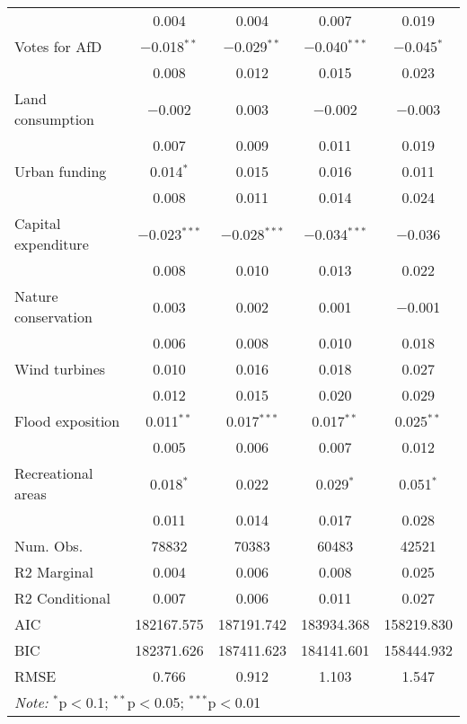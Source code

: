 \begin{table}
\begin{tabular}[t]{lcccc}
 & \num{0.004} & \num{0.004} & \num{0.007} & \num{0.019}\\
Votes for AfD & \num{-0.018}$^{**}$ & \num{-0.029}$^{**}$ & \num{-0.040}$^{***}$ & \num{-0.045}$^{*}$\\
 & \num{0.008} & \num{0.012} & \num{0.015} & \num{0.023}\\
Land consumption & \num{-0.002} & \num{0.003} & \num{-0.002} & \num{-0.003}\\
 & \num{0.007} & \num{0.009} & \num{0.011} & \num{0.019}\\
Urban funding & \num{0.014}$^{*}$ & \num{0.015} & \num{0.016} & \num{0.011}\\
 & \num{0.008} & \num{0.011} & \num{0.014} & \num{0.024}\\
Capital expenditure & \num{-0.023}$^{***}$ & \num{-0.028}$^{***}$ & \num{-0.034}$^{***}$ & \num{-0.036}\\
 & \num{0.008} & \num{0.010} & \num{0.013} & \num{0.022}\\
Nature conservation & \num{0.003} & \num{0.002} & \num{0.001} & \num{-0.001}\\
 & \num{0.006} & \num{0.008} & \num{0.010} & \num{0.018}\\
Wind turbines & \num{0.010} & \num{0.016} & \num{0.018} & \num{0.027}\\
 & \num{0.012} & \num{0.015} & \num{0.020} & \num{0.029}\\
Flood exposition & \num{0.011}$^{**}$ & \num{0.017}$^{***}$ & \num{0.017}$^{**}$ & \num{0.025}$^{**}$\\
 & \num{0.005} & \num{0.006} & \num{0.007} & \num{0.012}\\
Recreational areas & \num{0.018}$^{*}$ & \num{0.022} & \num{0.029}$^{*}$ & \num{0.051}$^{*}$\\
 & \num{0.011} & \num{0.014} & \num{0.017} & \num{0.028}\\
\midrule
Num. Obs. & \num{78832} & \num{70383} & \num{60483} & \num{42521}\\
R2 Marginal & \num{0.004} & \num{0.006} & \num{0.008} & \num{0.025}\\
R2 Conditional & \num{0.007} & \num{0.006} & \num{0.011} & \num{0.027}\\
AIC & \num{182167.575} & \num{187191.742} & \num{183934.368} & \num{158219.830}\\
BIC & \num{182371.626} & \num{187411.623} & \num{184141.601} & \num{158444.932}\\
RMSE & \num{0.766} & \num{0.912} & \num{1.103} & \num{1.547}\\
\bottomrule
\multicolumn{5}{l}{\rule{0pt}{1em}\textit{Note: } $^{*}$p$<$0.1; $^{**}$p$<$0.05; $^{***}$p$<$0.01}\\
\end{tabular}
\end{table}